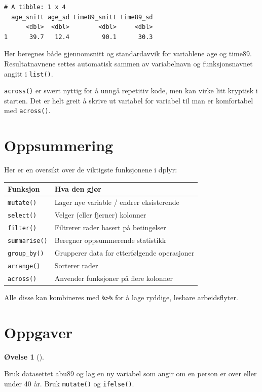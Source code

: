 \documentclass[
  norsk,
  letterpaper,
  DIV=11,
  numbers=noendperiod]{scrreprt}
\theoremstyle{definition}
\newtheorem{exercise}{Øvelse}[chapter]
\theoremstyle{remark}
\begin{document}
\begin{verbatim}
# A tibble: 1 x 4
  age_snitt age_sd time89_snitt time89_sd
      <dbl>  <dbl>        <dbl>     <dbl>
1      39.7   12.4         90.1      30.3
\end{verbatim}

Her beregnes både gjennomsnitt og standardavvik for variablene age og
time89. Resultatnavnene settes automatisk sammen av variabelnavn og
funksjonsnavnet angitt i \texttt{list()}.

\texttt{across()} er svært nyttig for å unngå repetitiv kode, men kan
virke litt kryptisk i starten. Det er helt greit å skrive ut variabel
for variabel til man er komfortabel med \texttt{across()}.

\section{Oppsummering}\label{oppsummering-8}

Her er en oversikt over de viktigste funksjonene i dplyr:

\begin{longtable}[]{@{}ll@{}}
\toprule\noalign{}
Funksjon & Hva den gjør \\
\midrule\noalign{}
\endhead
\bottomrule\noalign{}
\endlastfoot
\texttt{mutate()} & Lager nye variable / endrer eksisterende \\
\texttt{select()} & Velger (eller fjerner) kolonner \\
\texttt{filter()} & Filtrerer rader basert på betingelser \\
\texttt{summarise()} & Beregner oppsummerende statistikk \\
\texttt{group\_by()} & Grupperer data for etterfølgende operasjoner \\
\texttt{arrange()} & Sorterer rader \\
\texttt{across()} & Anvender funksjoner på flere kolonner \\
\end{longtable}

Alle disse kan kombineres med \texttt{\%\textgreater{}\%} for å lage
ryddige, lesbare arbeidsflyter.

\section{Oppgaver}\label{oppgaver-3}

\begin{exercise}[]\protect\hypertarget{exr-}{}\label{exr-}

Bruk datasettet abu89 og lag en ny variabel som angir om en person er
over eller under 40 år. Bruk \texttt{mutate()} og \texttt{ifelse()}.

\end{exercise}
\end{document}

